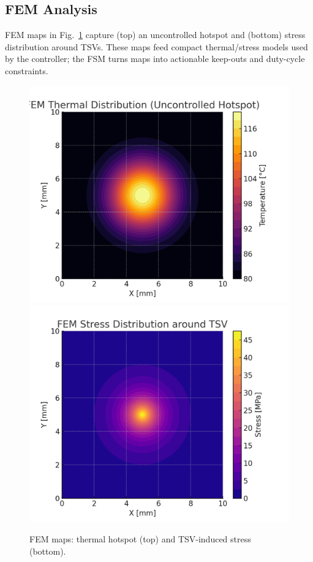 \documentclass[conference]{IEEEtran}
\begin{document}
\subsection{FEM Analysis}
FEM maps in Fig.~\ref{fig:fem} capture (top) an uncontrolled hotspot and (bottom) stress distribution around TSVs. These maps feed compact thermal/stress models used by the controller; the FSM turns maps into actionable keep-outs and duty-cycle constraints.

\begin{figure}[t]
\centering
\includegraphics[width=0.95\linewidth]{figs/fem_thermal_map.png}\\[3pt]
\includegraphics[width=0.95\linewidth]{figs/fem_stress_map.png}
\caption{FEM maps: thermal hotspot (top) and TSV-induced stress (bottom).}
\label{fig:fem}
\end{figure}
\end{document}
